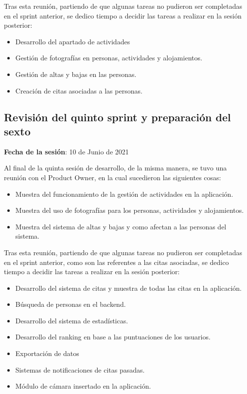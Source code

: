 Tras esta reunión, partiendo de que algunas tareas no pudieron ser completadas en el sprint anterior, se dedico tiempo a decidir las tareas a realizar en la sesión posterior:

\begin{itemize}
    \item Desarrollo del apartado de actividades
    \item Gestión de fotografías en personas, actividades y alojamientos.
    \item Gestión de altas y bajas en las personas.
    \item Creación de citas asociadas a las personas.
\end{itemize}

\subsection{Revisión del quinto sprint y preparación del sexto}

\textbf{Fecha de la sesión}: 10 de Junio de 2021

Al final de la quinta sesión de desarrollo, de la misma manera, se tuvo una reunión con el Product Owner, en la cual sucedieron las siguientes cosas: 

\begin{itemize}
    \item Muestra del funcionamiento de la gestión de actividades en la aplicación.
    \item Muestra del uso de fotografías para los personas, actividades y alojamientos.
    \item Muestra del sistema de altas y bajas y como afectan a las personas del sistema.
\end{itemize}

Tras esta reunión, partiendo de que algunas tareas no pudieron ser completadas en el sprint anterior, como son las referentes a las citas asociadas, se dedico tiempo a decidir las tareas a realizar en la sesión posterior:

\begin{itemize}
    \item Desarrollo del sistema de citas y muestra de todas las citas en la aplicación.
    \item Búsqueda de personas en el backend.
    \item Desarrollo del sistema de estadísticas.
    \item Desarrollo del ranking en base a las puntuaciones de los usuarios.
    \item Exportación de datos 
    \item Sistemas de notificaciones de citas pasadas.
    \item Módulo de cámara insertado en la aplicación.
\end{itemize}